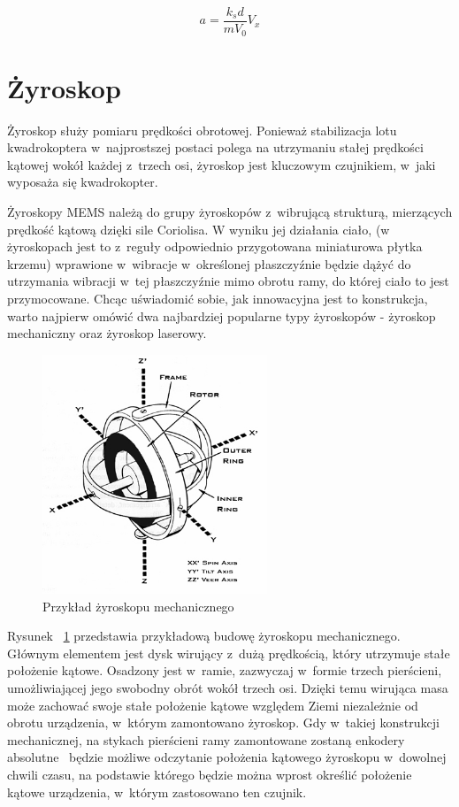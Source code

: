 \documentclass[11pt, twoside]{Thesis} %
\begin{document}
\begin{equation}
	a = \frac{k{_s}d}{mV_0}V_x
\end{equation}

\section{Żyroskop}

Żyroskop służy pomiaru prędkości obrotowej. Ponieważ stabilizacja lotu kwadrokoptera w~najprostszej postaci polega na utrzymaniu stałej prędkości kątowej wokół każdej z~trzech osi, żyroskop jest kluczowym czujnikiem, w~jaki wyposaża się kwadrokopter\cite{quadro9, quadro16}. 

Żyroskopy MEMS należą do grupy żyroskopów z~wibrującą strukturą, mierzących prędkość kątową dzięki sile Coriolisa. W wyniku jej działania ciało, (w żyroskopach jest to z~reguły odpowiednio przygotowana miniaturowa płytka krzemu) wprawione w~wibracje w~określonej płaszczyźnie będzie dążyć do utrzymania wibracji w~tej płaszczyźnie mimo obrotu ramy, do której ciało to jest przymocowane. Chcąc uświadomić sobie, jak innowacyjna jest to konstrukcja, warto najpierw omówić dwa najbardziej popularne typy żyroskopów - żyroskop mechaniczny oraz żyroskop laserowy.

\begin{figure}[H]
	\centering
	\includegraphics[width=0.6\textwidth]{Pictures/Gyroscope_Theory.jpg}
	\caption[Przykład żyroskopu mechanicznego]{Przykład żyroskopu mechanicznego~\cite{mems10}}
	\label{fig:Gyroscope_Theory}
\end{figure}

Rysunek ~\ref{fig:Gyroscope_Theory} przedstawia przykładową budowę żyroskopu mechanicznego. Głównym elementem jest dysk wirujący z~dużą prędkością, który utrzymuje stałe położenie kątowe. Osadzony jest w~ramie, zazwyczaj w~formie trzech pierścieni, umożliwiającej jego swobodny obrót wokół trzech osi. Dzięki temu wirująca masa może zachować swoje stałe położenie kątowe względem Ziemi niezależnie od obrotu urządzenia, w~którym zamontowano żyroskop. Gdy w~takiej konstrukcji mechanicznej, na stykach pierścieni ramy zamontowane zostaną enkodery absolutne~\cite{mems11} będzie możliwe odczytanie położenia kątowego żyroskopu w~dowolnej chwili czasu, na podstawie którego będzie można wprost określić położenie kątowe urządzenia, w~którym zastosowano ten czujnik. 
\end{document}
